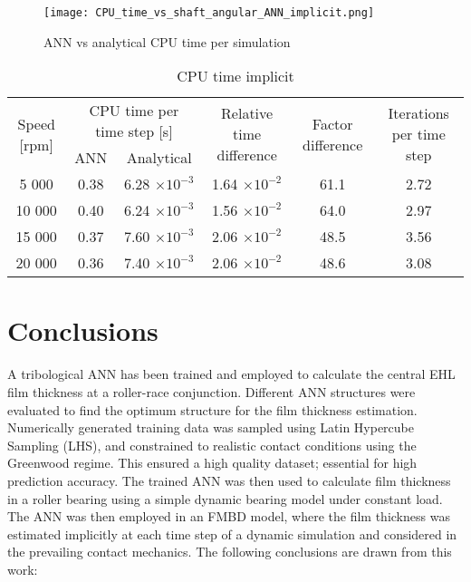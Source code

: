 \begin{figure}
	\centering
	\texttt{[image: CPU\_time\_vs\_shaft\_angular\_ANN\_implicit.png]}
	\caption{ANN vs analytical CPU time per simulation}
	\label{CPU_time_vs_shaft_angular_ANN_implicit}
\end{figure}

\begin{table*}
	\caption{CPU time implicit}
	\label{CPU time implicit}
	\centering
	\renewcommand{\arraystretch}{1.5}%
	\begin{tabular}{|c|c|c|c|c|c|}
		\hline \multirow{2}{*}{ Speed [rpm] } & \multicolumn{2}{|c|}{ CPU time per time step [s] } & \multirow{2}{*}{ Relative time difference } & \multirow{2}{*}{ Factor difference } & \multirow{2}{*}{ Iterations per time step } \\
		\cline { 2 - 3 } & ANN & Analytical & & & \\
		\hline 5 000 & 0.38 & 6.28 $\times 10^{-3}$ & 1.64 $\times 10^{-2}$ & 61.1 & 2.72 \\
		\hline 10 000 & 0.40 & 6.24 $\times 10^{-3}$ & 1.56 $\times 10^{-2}$ & 64.0 & 2.97 \\
		\hline 15 000 & 0.37 & 7.60 $\times 10^{-3}$ & 2.06 $\times 10^{-2}$ & 48.5 & 3.56 \\
		\hline 20 000 & 0.36 & 7.40 $\times 10^{-3}$ & 2.06 $\times 10^{-2}$ & 48.6 & 3.08 \\
		\hline
	\end{tabular}
\end{table*}

\section{Conclusions}

A tribological ANN has been trained and employed to calculate the central EHL film thickness at a roller-race conjunction. Different ANN structures were evaluated to find the optimum structure for the film thickness estimation. Numerically generated training data was sampled using Latin Hypercube Sampling (LHS), and constrained to realistic contact conditions using the Greenwood regime. This ensured a high quality dataset; essential for high prediction accuracy. The trained ANN was then used to calculate film thickness in a roller bearing using a simple dynamic bearing model under constant load. The ANN was then employed in an FMBD model, where the film thickness was estimated implicitly at each time step of a dynamic simulation and considered in the prevailing contact mechanics. The following conclusions are drawn from this work:

